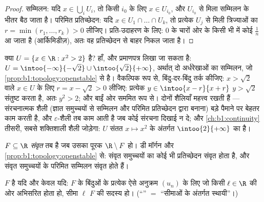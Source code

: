 \begin{proof}
सम्मिलन: यदि $x \in \bigcup_i U_i$, तो किसी $i_0$ के लिए $x \in U_{i_0}$, और
$U_{i_0}$ से मिला  सम्मिलन के भीतर बैठ जाता है। परिमित प्रतिच्छेदन:
यदि $x \in U_1 \cap \dots \cap U_k$, तो प्रत्येक $U_j$ से मिली त्रिज्याओं का
$r = \min(r_1, \dots, r_k) > 0$ लीजिए। प्रति-उदाहरण के लिए: $0$ के चारों ओर
के किसी भी  में कोई $\frac{1}{n}$ आ जाता है (आर्किमिडीज़), अतः वह
प्रतिच्छेदन से बाहर निकल जाता है।
\end{proof}

\begin{example}[स्पष्ट त्रिज्याओं से विवृतता प्रमाणित करना]\label{ex:b1:topology:radii}
क्या $U = \{x \in \R : x^2 > 2\}$  है? हाँ, और प्रमाणपत्र लिखा जा सकता
है: $U = \intoo{-\infty}{-\sqrt2} \cup \intoo{\sqrt2}{+\infty}$, अर्थात् दो
 अर्धरेखाओं का सम्मिलन, जो \cref{prop:b1:topology:openstable} से 
है। वैकल्पिक रूप से, बिंदु-दर-बिंदु तर्क कीजिए: $x > \sqrt 2$ वाले $x \in U$
के लिए $r = x - \sqrt2 > 0$ लीजिए: प्रत्येक $y \in \intoo{x - r}{x + r}$ $y
> \sqrt 2$ संतुष्ट करता है, अतः $y^2 > 2$; और बाईं ओर सममित रूप से। दोनों
शैलियाँ महत्त्व रखती हैं --- संरचनात्मक शैली (ज्ञात  समुच्चयों से
सम्मिलन और परिमित प्रतिच्छेदन द्वारा बनाना) बड़े पैमाने पर बेहतर काम करती
है, और $\varepsilon$-शैली तब काम आती है जब कोई संरचना दिखाई न दे; और
\cref{ch:b1:continuity} तीसरी, सबसे शक्तिशाली शैली जोड़ेगा: $U$ संतत $x
\mapsto x^2$ के अंतर्गत  $\intoo{2}{+\infty}$ का  है।
\end{example}

\begin{definition}[संवृत समुच्चय]\label{def:b1:topology:closed}
 $F \subseteq \R$ \emph{संवृत} तब है जब उसका
पूरक $\R \setminus F$  हो। डी मॉर्गन और
\cref{prop:b1:topology:openstable} से: संवृत समुच्चयों का कोई भी प्रतिच्छेदन
संवृत होता है, और संवृत समुच्चयों के परिमित सम्मिलन संवृत होते हैं।
\end{definition}

\begin{theorem}[संवृत समुच्चयों का अनुक्रमीय अभिलक्षण]\label{thm:b1:topology:seqclosed}
$F$  है यदि और केवल यदि: $F$ के बिंदुओं के प्रत्येक ऐसे अनुक्रम $(u_n)$
के लिए जो किसी $\ell \in \R$ की ओर अभिसरित होता हो, सीमा $\ell$ $F$ की सदस्य
हो। (``'' $=$ ``सीमाओं के अंतर्गत स्थायी''।)
\end{theorem}

